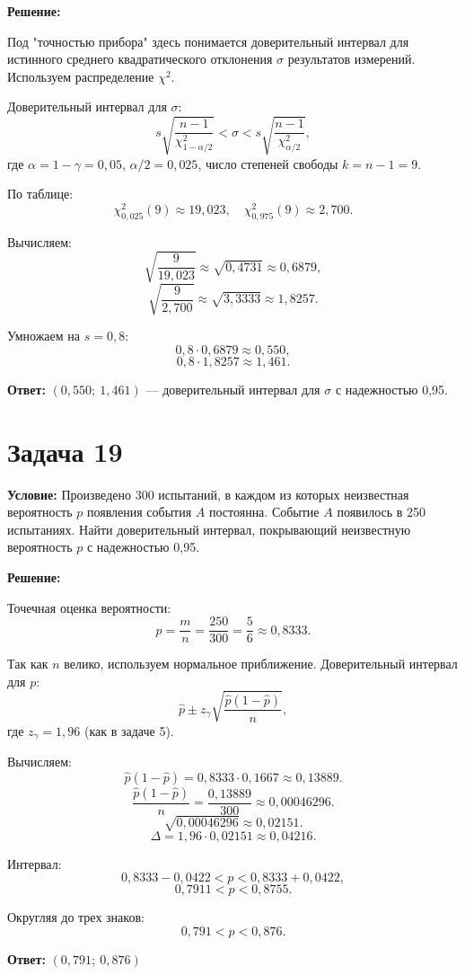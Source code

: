 \documentclass[a4paper,14pt]{article}
\begin{document}
\textbf{Решение:}

Под "точностью прибора" здесь понимается доверительный интервал для истинного среднего квадратического отклонения \( \sigma \) результатов измерений. Используем распределение \( \chi^2 \).

Доверительный интервал для \( \sigma \):
\[
s\sqrt{\frac{n-1}{\chi^2_{1-\alpha/2}}} < \sigma < s\sqrt{\frac{n-1}{\chi^2_{\alpha/2}}},
\]
где \( \alpha = 1 - \gamma = 0{,}05 \), \( \alpha/2 = 0{,}025 \), число степеней свободы \( k = n-1 = 9 \).

По таблице:
\[
\chi^2_{0{,}025}(9) \approx 19{,}023, \quad \chi^2_{0{,}975}(9) \approx 2{,}700.
\]

Вычисляем:
\[
\sqrt{\frac{9}{19{,}023}} \approx \sqrt{0{,}4731} \approx 0{,}6879,
\]
\[
\sqrt{\frac{9}{2{,}700}} \approx \sqrt{3{,}3333} \approx 1{,}8257.
\]

Умножаем на \( s = 0{,}8 \):
\[
0{,}8 \cdot 0{,}6879 \approx 0{,}550,
\]
\[
0{,}8 \cdot 1{,}8257 \approx 1{,}461.
\]

\textbf{Ответ:} \( \boxed{(0{,}550; \ 1{,}461)} \) — доверительный интервал для \( \sigma \) с надежностью 0,95.

\vspace{1cm}

\section*{Задача 19}
\textbf{Условие:}
Произведено 300 испытаний, в каждом из которых неизвестная вероятность \( p \) появления события \( A \) постоянна. Событие \( A \) появилось в 250 испытаниях. Найти доверительный интервал, покрывающий неизвестную вероятность \( p \) с надежностью 0,95.

\textbf{Решение:}

Точечная оценка вероятности:
\[
\hat{p} = \frac{m}{n} = \frac{250}{300} = \frac{5}{6} \approx 0{,}8333.
\]

Так как \( n \) велико, используем нормальное приближение. Доверительный интервал для \( p \):
\[
\hat{p} \pm z_{\gamma} \sqrt{\frac{\hat{p}(1-\hat{p})}{n}},
\]
где \( z_{\gamma} = 1{,}96 \) (как в задаче 5).

Вычисляем:
\[
\hat{p}(1-\hat{p}) = 0{,}8333 \cdot 0{,}1667 \approx 0{,}13889.
\]
\[
\frac{\hat{p}(1-\hat{p})}{n} = \frac{0{,}13889}{300} \approx 0{,}00046296.
\]
\[
\sqrt{0{,}00046296} \approx 0{,}02151.
\]
\[
\Delta = 1{,}96 \cdot 0{,}02151 \approx 0{,}04216.
\]

Интервал:
\[
0{,}8333 - 0{,}0422 < p < 0{,}8333 + 0{,}0422,
\]
\[
0{,}7911 < p < 0{,}8755.
\]

Округляя до трех знаков:
\[
0{,}791 < p < 0{,}876.
\]

\textbf{Ответ:} \( \boxed{(0{,}791; \ 0{,}876)} \)
\end{document}
